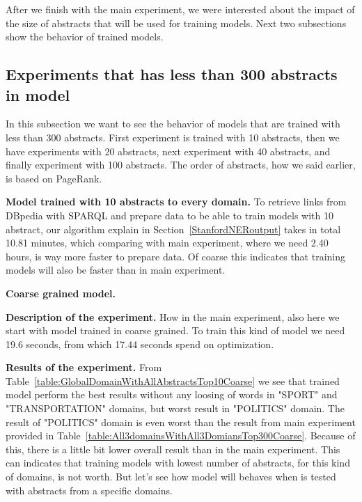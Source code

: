 \documentclass[thesis=M,english]{FITthesis}[2018/05/30]
\begin{document}
	After we finish with the main experiment, we were interested about the impact of the size of abstracts that will be used for training models. Next two subsections show the behavior of trained models.     
\subsection{Experiments that has less than 300 abstracts in model}\label{LessThan300Abstracts}
	In this subsection we want to see the behavior of models that are trained with less than 300 abstracts. First experiment is trained with 10 abstracts, then we have experiments with 20 abstracts, next experiment with 40 abstracts, and finally experiment with 100 abstracts. The order of abstracts, how we said earlier, is based on PageRank.
	
	\textbf{Model trained with 10 abstracts to every domain.} To retrieve links from DBpedia with SPARQL and prepare data to be able to train models with 10 abstract, our algorithm explain in Section~\ref{StanfordNERoutput} takes in total 10.81 minutes, which comparing with main experiment, where we need 2.40 hours, is way more faster to prepare data. Of coarse this indicates that training models will also be faster than in main experiment.
	
	\textbf{Coarse grained model.} 
	
	\textbf{Description of the experiment.} How in the main experiment, also here we start with model trained in coarse grained. To train this kind of model we need 19.6 seconds, from which 17.44 seconds spend on optimization. 
	
	\textbf{Results of the experiment.} From Table~\ref{table:GlobalDomainWithAllAbstractsTop10Coarse} we see that trained model perform the best results without any loosing of words in "SPORT" and "TRANSPORTATION" domains, but worst result in "POLITICS" domain. The result of "POLITICS" domain is even worst than the result from main experiment provided in Table~\ref{table:All3domainsWithAll3DomiansTop300Coarse}. Because of this, there is a little bit lower overall result than in the main experiment. This can indicates that training models with lowest number of abstracts, for this kind of domains, is not worth. But let's see how model will behaves when is tested with abstracts from a specific domains.
	
\end{document}
